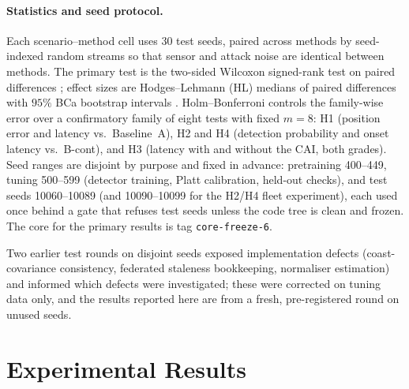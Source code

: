 \documentclass[12pt,a4paper]{article}
\begin{document}
\paragraph{Statistics and seed protocol.}
Each scenario--method cell uses $30$ test seeds, paired across methods by seed-indexed random streams so that sensor and attack noise are identical between methods. The primary test is the two-sided Wilcoxon signed-rank test on paired differences \cite{wilcoxon1945individual}; effect sizes are Hodges--Lehmann (HL) medians of paired differences \cite{hodges1963estimates} with $95\%$ BCa bootstrap intervals \cite{efron1987better}. Holm--Bonferroni \cite{holm1979simple} controls the family-wise error over a confirmatory family of eight tests with fixed $m=8$: H1 (position error and latency vs.\ Baseline~A), H2 and H4 (detection probability and onset latency vs.\ B-cont), and H3 (latency with and without the CAI, both grades). Seed ranges are disjoint by purpose and fixed in advance: pretraining 400--449, tuning 500--599 (detector training, Platt calibration, held-out checks), and test seeds 10060--10089 (and 10090--10099 for the H2/H4 fleet experiment), each used once behind a gate that refuses test seeds unless the code tree is clean and frozen. The core for the primary results is tag \texttt{core-freeze-6}.

Two earlier test rounds on disjoint seeds exposed implementation defects (coast-covariance consistency, federated staleness bookkeeping, normaliser estimation) and informed which defects were investigated; these were corrected on tuning data only, and the results reported here are from a fresh, pre-registered round on unused seeds.

\section{Experimental Results}
\label{sec:results}
\end{document}
